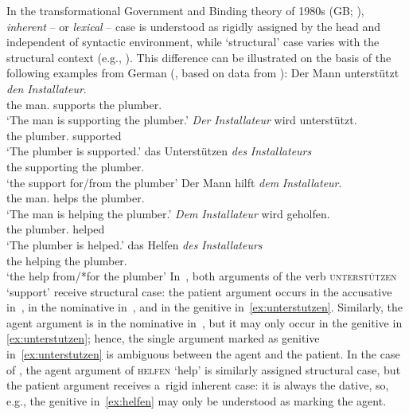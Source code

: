 \documentclass[output=paper]{langsci/langscibook}
\begin{document}
In the transformational Government and Binding theory of 1980s (GB; \citealt{Chomsky81a,Chomsky86}), \emph{inherent} -- or \emph{lexical} -- case is understood as rigidly assigned by the head and independent of syntactic environment, while `structural’ case varies with the structural context (e.g., \citealt[70]{Haider85b-ohne-crossref}).  This difference can be illustrated on the basis of the following examples from German (\citealt[63]{Prze99b}, based on data from \citealt{HM94a}):
\eal
\label{ex:unterstutzen}
\ex 
\gll  Der Mann unterst\"utzt \textit{den} \textit{Installateur}. \\ 
      the man.\NOM{} supports the plumber.\ACC{}\\
\glt `The man is supporting the plumber.'
\ex
\gll   \textit{Der} \textit{Installateur} wird unterst\"utzt. \\
      the plumber.\NOM{} \Aux{} supported\\
\glt `The plumber is supported.'
\ex
\gll  das Unterst\"utzen \textit{des} \textit{Installateurs} \\
      the supporting the plumber.\GEN{}\\
\glt `the support for/from the plumber'
\zl
\eal
\label{ex:helfen}
\ex
\gll Der Mann hilft \textit{dem} \textit{Installateur}. \\
     the man.\NOM{} helps the plumber.\DAT{}\\
\glt `The man is helping the plumber.'
\ex
\gll \textit{Dem} \textit{Installateur} wird geholfen. \\
     the plumber.\DAT{} \Aux{} helped\\
\glt `The plumber is helped.'
\ex
\gll   das Helfen \textit{des} \textit{Installateurs} \\
      the helping the plumber.\GEN{}\\
\glt    `the help from/*for the plumber'
\zl
In~, both arguments of the verb \textsc{unterst\"utzen} `support’ receive structural case: the patient argument occurs in the accusative in~, in the nominative in~, and in the genitive in~\cref{ex:unterstutzen}.  Similarly, the agent argument is in the nominative in~, but it may only occur in the genitive in \cref{ex:unterstutzen}; hence, the single argument marked as genitive in~\cref{ex:unterstutzen} is ambiguous between the agent and the patient.  In the case of , the agent argument of \textsc{helfen} `help’ is similarly assigned structural case, but the patient argument receives a~rigid inherent case: it is always the dative, so, e.g., the genitive in~\cref{ex:helfen} may only be understood as marking the agent.
\end{document}
